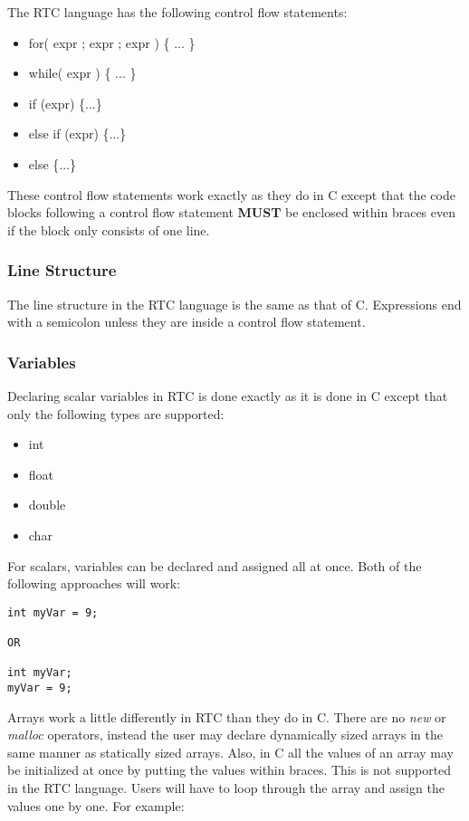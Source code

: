 The RTC language has the following control flow statements:

\begin{itemize}
  \item for( expr ; expr ; expr ) \{ ... \}
  \item while( expr )  \{ ... \}
  \item if (expr) \{...\}
  \item else if (expr) \{...\}
  \item else \{...\}
\end{itemize}

\noindent These control flow statements work exactly as they do in C
except that the code blocks following a control flow statement 
\textbf{MUST} be enclosed within braces even if the block only consists of 
one line.

\subsubsection{Line Structure}

The line structure in the RTC language is the same as that of C. Expressions
end with a semicolon unless they are inside a control flow statement.

\subsubsection{Variables}

Declaring scalar variables in RTC is done exactly as it is done in C except 
that only the following types are supported:

\begin{itemize}
  \item int
  \item float
  \item double
  \item char
\end{itemize}

\noindent For scalars, variables can be declared and assigned all at once. Both of the 
following approaches will work:

{\ttfamily \begin{verbatim}
int myVar = 9;

OR

int myVar;
myVar = 9;
\end{verbatim}
}

\noindent Arrays work a little differently in RTC than they do in C. There are
no \emph{new} or \emph{malloc} operators, instead the user may 
declare dynamically sized arrays in the same manner as statically sized 
arrays. Also, in C all the values of an array may be initialized at once by 
putting the values within braces. This is not supported in the RTC language.
Users will have to loop through the array and assign the values one by one.
For example:

